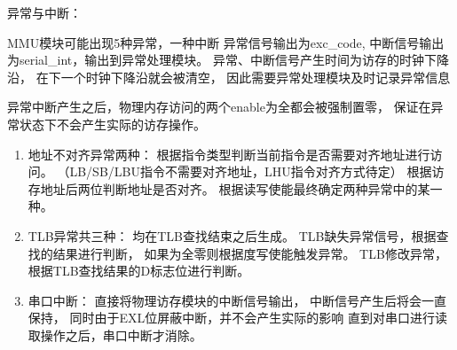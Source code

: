             异常与中断：
            \begin{minipage}[t]{0.8\linewidth}
                MMU模块可能出现5种异常，一种中断%
                异常信号输出为exc\_code, %
                中断信号输出为serial\_int，输出到异常处理模块。%
                异常、中断信号产生时间为访存的时钟下降沿，%
                在下一个时钟下降沿就会被清空，%
                因此需要异常处理模块及时记录异常信息

                异常中断产生之后，物理内存访问的两个enable为全都会被强制置零，%
                保证在异常状态下不会产生实际的访存操作。

                \begin{enumerate}
                \item
                地址不对齐异常两种：%
                    根据指令类型判断当前指令是否需要对齐地址进行访问。%
                    （LB/SB/LBU指令不需要对齐地址，LHU指令对齐方式待定）%
                    根据访存地址后两位判断地址是否对齐。%
                    根据读写使能最终确定两种异常中的某一种。%
                \item
                TLB异常共三种：%
                    均在TLB查找结束之后生成。%
                    TLB缺失异常信号，根据查找的结果进行判断，%
                    如果为全零则根据度写使能触发异常。%
                    TLB修改异常，根据TLB查找结果的D标志位进行判断。%
                \item
                串口中断：%
                    直接将物理访存模块的中断信号输出，%
                    中断信号产生后将会一直保持，%
                    同时由于EXL位屏蔽中断，并不会产生实际的影响%
                    直到对串口进行读取操作之后，串口中断才消除。
                \end{enumerate}
            \end{minipage}
            
